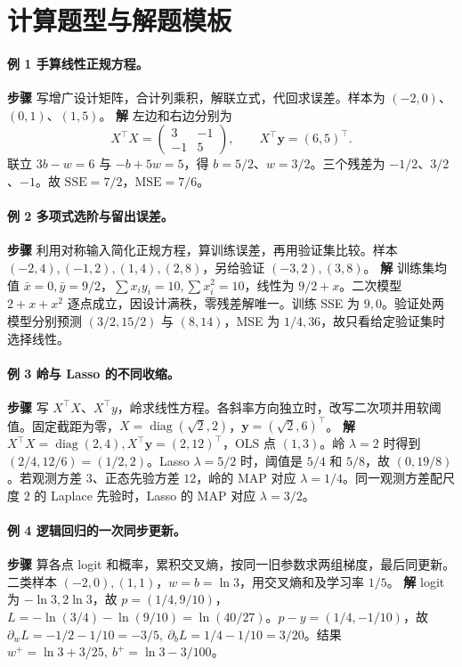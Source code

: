 \documentclass[UTF8,a4paper,zihao=-4,fontset=fandol]{ctexrep}
\begin{document}
\section{计算题型与解题模板}
\paragraph{例 1 手算线性正规方程。}
\textbf{步骤} 写增广设计矩阵，合计列乘积，解联立式，代回求误差。样本为 \((-2,0)\)、\((0,1)\)、\((1,5)\)。
\textbf{解} 左边和右边分别为
\[
 X^\top X=\begin{pmatrix}3&-1\\-1&5\end{pmatrix},\qquad
 X^\top\bm y=(6,5)^\top .
\]
联立 \(3b-w=6\) 与 \(-b+5w=5\)，得 \(b=5/2\)、\(w=3/2\)。三个残差为 \(-1/2\)、\(3/2\)、\(-1\)。故 \(\mathrm{SSE}=7/2\)，\(\mathrm{MSE}=7/6\)。

\paragraph{例 2 多项式选阶与留出误差。}
\textbf{步骤} 利用对称输入简化正规方程，算训练误差，再用验证集比较。样本 \((-2,4),(-1,2),(1,4),(2,8)\)，另给验证 \((-3,2),(3,8)\)。
\textbf{解} 训练集均值 \(\bar x=0,\bar y=9/2\)，\(\sum x_iy_i=10,\sum x_i^2=10\)，线性为 \(9/2+x\)。二次模型 \(2+x+x^2\) 逐点成立，因设计满秩，零残差解唯一。训练 SSE 为 \(9,0\)。验证处两模型分别预测 \((3/2,15/2)\) 与 \((8,14)\)，MSE 为 \(1/4,36\)，故只看给定验证集时选择线性。

\paragraph{例 3 岭与 Lasso 的不同收缩。}
\textbf{步骤} 写 \(X^\top X\)、\(X^\top y\)，岭求线性方程。各斜率方向独立时，改写二次项并用软阈值。固定截距为零，\(X=\operatorname{diag}(\sqrt2,2)\)，\(\bm y=(\sqrt2,6)^\top\)。
\textbf{解} \(X^\top X=\operatorname{diag}(2,4),X^\top\bm y=(2,12)^\top\)，OLS 点 \((1,3)\)。岭 \(\lambda=2\) 时得到 \((2/4,12/6)=(1/2,2)\)。Lasso \(\lambda=5/2\) 时，阈值是 \(5/4\) 和 \(5/8\)，故 \((0,19/8)\)。若观测方差 \(3\)、正态先验方差 \(12\)，岭的 MAP 对应 \(\lambda=1/4\)。同一观测方差配尺度 \(2\) 的 Laplace 先验时，Lasso 的 MAP 对应 \(\lambda=3/2\)。

\paragraph{例 4 逻辑回归的一次同步更新。}
\textbf{步骤} 算各点 logit 和概率，累积交叉熵，按同一旧参数求两组梯度，最后同更新。二类样本 \((-2,0),(1,1)\)，\(w=b=\ln 3\)，用交叉熵和及学习率 \(1/5\)。
\textbf{解} logit 为 \(-\ln3,2\ln3\)，故 \(p=(1/4,9/10)\)，\(L=-\ln(3/4)-\ln(9/10)=\ln(40/27)\)。\(p-y=(1/4,-1/10)\)，故 \(\partial_wL=-1/2-1/10=-3/5,\ \partial_bL=1/4-1/10=3/20\)。结果 \(w^+=\ln3+3/25,\ b^+=\ln3-3/100\)。
\end{document}
